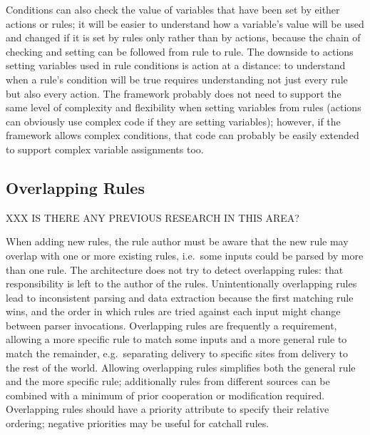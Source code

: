 Conditions can also check the value of variables that have been set by
either actions or rules; it will be easier to understand how a variable's
value will be used and changed if it is set by rules only rather than by
actions, because the chain of checking and setting can be followed from
rule to rule.  The downside to actions setting variables used in rule
conditions is action at a distance: to understand when a rule's condition
will be true requires understanding not just every rule but also every
action.  The framework probably does not need to support the same level of
complexity and flexibility when setting variables from rules (actions can
obviously use complex code if they are setting variables); however, if the
framework allows complex conditions, that code can probably be easily
extended to support complex variable assignments too.

\subsection{Overlapping Rules}

\label{overlapping rules in architecture}

XXX IS THERE ANY PREVIOUS RESEARCH IN THIS AREA\@?

When adding new rules, the rule author must be aware that the new rule may
overlap with one or more existing rules, i.e.\ some inputs could be parsed
by more than one rule.  The architecture does not try to detect overlapping
rules: that responsibility is left to the author of the rules.
Unintentionally overlapping rules lead to inconsistent parsing and data
extraction because the first matching rule wins, and the order in which
rules are tried against each input might change between parser invocations.
Overlapping rules are frequently a requirement, allowing a more specific
rule to match some inputs and a more general rule to match the remainder,
e.g.\ separating  delivery to specific sites from
 delivery to the rest of the world.  Allowing overlapping
rules simplifies both the general rule and the more specific rule;
additionally rules from different sources can be combined with a minimum of
prior cooperation or modification required.  Overlapping rules should have
a priority attribute to specify their relative ordering; negative
priorities may be useful for catchall rules.

